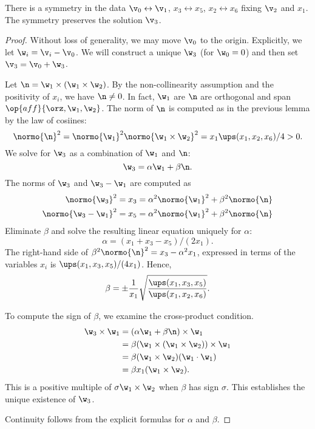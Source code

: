 \begin{remark} There is a symmetry in the data $\v_0\leftrightarrow \v_1$, $x_3\leftrightarrow x_5$,
$x_2\leftrightarrow x_6$ fixing $\v_2$ and $x_1$.  The symmetry preserves the solution $\v_3$.
\end{remark}

\begin{proof}
Without loss of generality, we may move $\v_0$ to the origin.  Explicitly,
we let $\w_i = \v_i - \v_0$.  We will construct a unique $\w_3$ (for $\w_0=0$) and then set $\v_3 = \v_0 + \w_3$.

Let $\n = \w_1 \times (\w_1\times \w_2)$.  By the non-collinearity assumption and the positivity of $x_i$,
we have $\n\ne 0$.  In fact, $\w_1$ are  $\n$ are orthogonal and span $\op{aff}\{\orz,\w_1,\w_2\}$.
The norm of $\n$ is computed as in the previous lemma by the law of cosiines:
\[
\normo{\n}^2 = \normo{\w_1}^2 \normo{\w_1\times \w_2}^2  = x_1 \ups(x_1,x_2,x_6)/4 > 0.
\]
We solve for $\w_3$ as a combination of $\w_1$ and $\n$:
\[
\w_3 = \alpha \w_1 + \beta \n.
\]
The norms of $\w_3$ and $\w_3-\w_1$ are computed as 
\begin{align*}
\normo{\w_3}^2 &= x_3 = \alpha^2 \normo {\w_1}^2 + \beta^2 \normo{\n}\\
\normo{\w_3-\w_1}^2 &= x_5 = \alpha^2 \normo {\w_1}^2 + \beta^2 \normo{\n}\\
\end{align*}
Eliminate $\beta$ and solve the resulting linear equation uniquely for $\alpha$:
\[
\alpha = (x_1 + x_3 - x_5)/(2 x_1).
\]
The right-hand side of $\beta^2 \normo{\n}^2 = x_3 - \alpha^2 x_1$, expressed in terms of the variables $x_i$
is $\ups(x_1,x_3,x_5)/(4 x_1)$.  Hence,
\[
\beta = \pm\frac{1}{x_1} \sqrt{\frac {\ups(x_1,x_3,x_5)}{\ups(x_1,x_2,x_6)}}.
\]

To compute the sign of $\beta$, we examine the cross-product condition.
\begin{align*}
\w_3\times \w_1 &= (\alpha \w_1 + \beta \n)\times \w_1 \\
 &= \beta  (\w_1\times (\w_1\times \w_2)) \times \w_1\\
&= \beta (\w_1 \times \w_2) (\w_1\cdot \w_1)\\
&= \beta x_1 (\w_1\times \w_2).
\end{align*}
This is a positive multiple of $\sigma \w_1\times \w_2$ when $\beta$ has sign $\sigma$.
This establishes the unique existence of $\w_3$.  

Continuity follows from the explicit formulas for $\alpha$ and $\beta$.
\end{proof}





